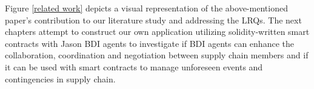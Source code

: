 \vspace{.5cm}

Figure \ref{related work} depicts a visual representation of the above-mentioned paper's contribution to our literature study and addressing the LRQs. The next chapters attempt to construct our own application utilizing solidity-written smart contracts with Jason \ac{BDI} agents to investigate if \ac{BDI} agents can enhance the collaboration, coordination and negotiation between supply chain members and if it can be used with smart contracts to manage unforeseen events and contingencies in supply chain.